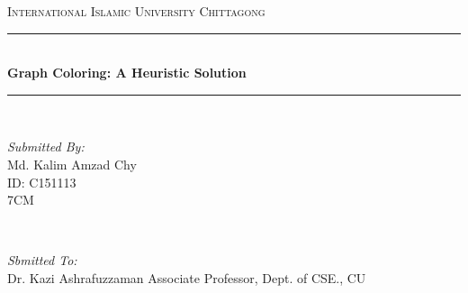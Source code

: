 \documentclass[a4paper,12pt]{article}
\begin{document}
\begin{titlepage}

\newcommand{\HRule}{\rule{\linewidth}{0.5mm}} %

\center %
 

\textsc{\LARGE International Islamic University Chittagong}\\[1.5cm] %

\HRule \\[0.4cm]
{ \huge \bfseries Graph Coloring: A Heuristic Solution}\\[0.4cm] %
\HRule \\[1.5cm]
 

\begin{minipage}{0.4\textwidth}
\begin{flushleft} \large
\emph{Submitted By:}\\
Md. Kalim Amzad Chy\\ %
ID: C151113\\
7CM
\end{flushleft}
\end{minipage}
~
\begin{minipage}{0.4\textwidth}
\begin{flushright} \large
\emph{Sbmitted To:} \\
Dr. Kazi Ashrafuzzaman %
Associate Professor, 
Dept. of CSE., CU
\end{flushright}
\end{minipage}\\[2cm]


\end{titlepage}
\end{document}
